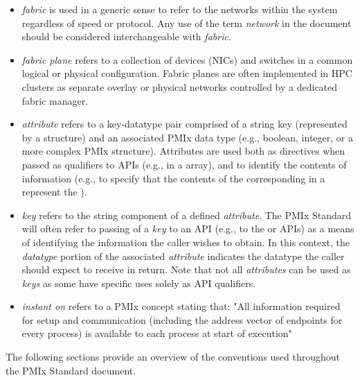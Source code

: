 \begin{itemize}
\item {}\emph{fabric} is used in a generic sense to refer to the networks within the system regardless of speed or protocol. Any use of the term \emph{network} in the document should be considered interchangeable with \emph{fabric}.

\item {}\emph{fabric plane} refers to a collection of devices (\acp{NIC}) and switches in a common logical or physical configuration. Fabric planes are often implemented in \ac{HPC} clusters as separate overlay or physical networks controlled by a dedicated fabric manager.

\item {}\emph{attribute} refers to a key-datatype pair comprised of a string key (represented by a  structure) and an associated \ac{PMIx} data type (e.g., boolean, integer, or a more complex \ac{PMIx} structure). Attributes are used both as directives when passed as qualifiers to \acp{API} (e.g., in a  array), and to identify the contents of information (e.g., to specify that the contents of the corresponding  in a  represent the ).

\item {}\emph{key} refers to the string component of a defined \emph{attribute}. The \ac{PMIx} Standard will often refer to passing of a \emph{key} to an \ac{API} (e.g., to the  or  \acp{API}) as a means of identifying the information the caller wishes to obtain. In this context, the \emph{datatype} portion of the associated \emph{attribute} indicates the datatype the caller should expect to receive in return. Note that not all \emph{attributes} can be used as \emph{keys} as some have specific uses solely as \ac{API} qualifiers.

\item {}\emph{instant on} refers to a \ac{PMIx} concept stating that: "All information required for setup and communication (including the address vector of endpoints for every process) is available to each process at start of execution"

\end{itemize}


The following sections provide an overview of the conventions used throughout the \ac{PMIx} Standard document.

